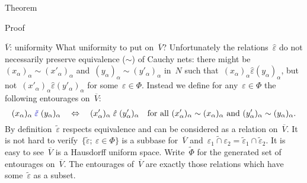 \begin{parsec}
\begin{point}{Theorem}
\begin{point}{Proof}
\begin{point}{$\overline{V}$: uniformity}
What uniformity to put on~$\overline{V}$?
Unfortunately the relations~$\hat\varepsilon$ do not necessarily preserve
equivalence ($\sim$) of Cauchy nets:
    there might be~$(x_\alpha)_\alpha \sim (x'_\alpha)_\alpha$
    and~$(y_\alpha)_\alpha \sim (y'_\alpha)_\alpha$ in~$N$
such that~$(x_\alpha)_\alpha \mathrel{\hat\varepsilon} (y_\alpha)_\alpha$,
but not~$(x'_\alpha)_\alpha \mathrel{\hat\varepsilon} (y'_\alpha)_\alpha$
for some~$\varepsilon \in \Phi$.
Instead we define for any~$\varepsilon \in \Phi$
the following entourages on~$\overline{V}$:
\begin{equation*}
    (x_\alpha)_\alpha \mathrel{\Define{\tilde\varepsilon}\index{epsiti@$\tilde\varepsilon$}}
    (y_\alpha)_\alpha \quad\Leftrightarrow\quad
    (x'_\alpha)_\alpha \mathrel{\hat\varepsilon}
    (y'_\alpha)_\alpha \quad
    \text{for all
        $(x'_\alpha)_\alpha \sim (x_\alpha)_\alpha$ 
    and $(y'_\alpha)_\alpha \sim (y_\alpha)_\alpha$.}
\end{equation*}
By definition~$\tilde\varepsilon$
respects equivalence and can be considered as a relation on~$\overline{V}$.
It is not hard to verify~$\{ \tilde\varepsilon ;\ \varepsilon \in \Phi\}$
is a subbase for~$\overline{V}$
and~$\widetilde{\varepsilon_1 \cap \varepsilon_2} = \tilde{\varepsilon}_1
\cap \tilde{\varepsilon}_2$.
It is easy to see~$\overline{V}$ is a Hausdorff uniform space.
Write~$\tilde\Phi$ for the generated set of entourages on~$\overline{V}$.
The entourages of~$\overline{V}$ are exactly those relations
    which have some~$\tilde\varepsilon$
    as a subset.


\end{point}
\end{point}
\end{point}
\end{parsec}
